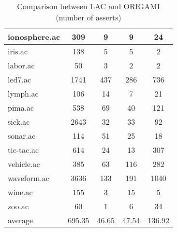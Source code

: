 \begin{table}[htbp]
\begin{tabular}{|l|c|c|c|c|}
		\hline
		ionosphere.ac   & 309           & 9                  & 9                        & 24                            \\
		\hline
		iris.ac         & 138           & 5                  & 5                        & 2                             \\
		\hline
		labor.ac        & 50            & 3                  & 2                        & 2                             \\
		\hline
		led7.ac         & 1741          & 437                & 286                      & 736                           \\
		\hline
		lymph.ac        & 106           & 14                 & 7                        & 21                            \\
		\hline
		pima.ac         & 538           & 69                 & 40                       & 121                           \\
		\hline
		sick.ac         & 2643          & 32                 & 33                       & 92                            \\
		\hline
		sonar.ac        & 114           & 51                 & 25                       & 18                            \\
		\hline
		tic-tac.ac      & 614           & 24                 & 13                       & 307                           \\
		\hline
		vehicle.ac      & 385           & 63                 & 116                      & 282                           \\
		\hline
		waveform.ac     & 3636          & 133                & 191                      & 1040                          \\
		\hline
		wine.ac         & 155           & 3                  & 15                       & 5                             \\
		\hline
		zoo.ac          & 60            & 1                  & 6                        & 34                            \\
		\hline
		average         & 695.35        & 46.65              & 47.54                    & 136.92                        \\
		\hline
		\end{tabular}
	\caption{Comparison between LAC and ORIGAMI (number of asserts)}
	\label{tab:comparison_lac_origami}
\end{table}